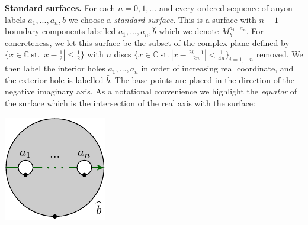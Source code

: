 \documentclass[aps, prl, letterpaper, twocolumn, superscriptaddress, notitlepage, 10pt]{revtex4-1}
\newcommand{\C}{\mathbb{C}}
\newcommand{\subsub}[1]{{\bf #1}}
\begin{document}
\newcommand{\StdM}{M^{a_1...a_n}_{b}}

\subsub{Standard surfaces.}
For each $n=0,1,...$ and every ordered sequence of
anyon labels $a_1,...,a_n,b$ we choose a \emph{standard surface}.
This is a surface with
$n+1$ boundary components labelled $a_1,...,a_n,\widehat{b}$ 
which we denote $\StdM.$ 
For concreteness, we 
let this surface be the subset of
the complex plane defined by
$\bigl\{x\in\C \ \mathrm{st.}\  |x-\frac{1}{2}|\le \frac{1}{2}\bigr\}$
with $n$ discs
$\bigl\{x\in\C \ \mathrm{st.}\  |x-\frac{2i-1}{2n}|< \frac{1}{4n}\bigr\}_{i=1,...n}$
removed.
We then label the interior holes $a_1,...,a_n$ in order of
increasing real coordinate, and the exterior hole is labelled $\widehat{b}.$
The base points are placed in the direction of the negative imaginary axis.
As a notational convenience we highlight the \emph{equator}
of the surface %
which is the intersection of
the real axis with the surface:
\begin{center}
\includegraphics[]{pic-disc-standard.pdf}
\end{center}
\end{document}
